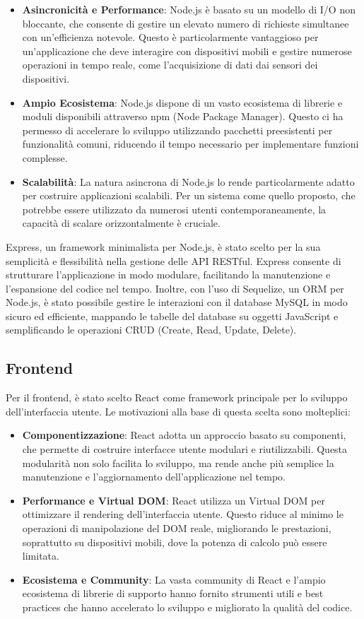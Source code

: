 \documentclass[twoside]{supsistudent}
\begin{document}
\begin{itemize}
  \item \textbf{Asincronicità e Performance}: Node.js è basato su un modello di I/O non bloccante, che consente di gestire un elevato numero di richieste simultanee con un'efficienza notevole. Questo è particolarmente vantaggioso per un'applicazione che deve interagire con dispositivi mobili e gestire numerose operazioni in tempo reale, come l'acquisizione di dati dai sensori dei dispositivi.
  \item \textbf{Ampio Ecosistema}: Node.js dispone di un vasto ecosistema di librerie e moduli disponibili attraverso npm (Node Package Manager). Questo ci ha permesso di accelerare lo sviluppo utilizzando pacchetti preesistenti per funzionalità comuni, riducendo il tempo necessario per implementare funzioni complesse.
  \item \textbf{Scalabilità}: La natura asincrona di Node.js lo rende particolarmente adatto per costruire applicazioni scalabili. Per un sistema come quello proposto, che potrebbe essere utilizzato da numerosi utenti contemporaneamente, la capacità di scalare orizzontalmente è cruciale.
\end{itemize}

Express, un framework minimalista per Node.js, è stato scelto per la sua semplicità e flessibilità nella gestione delle API RESTful. Express consente di strutturare l'applicazione in modo modulare, facilitando la manutenzione e l'espansione del codice nel tempo. Inoltre, con l'uso di Sequelize, un ORM per Node.js, è stato possibile gestire le interazioni con il database MySQL in modo sicuro ed efficiente, mappando le tabelle del database su oggetti JavaScript e semplificando le operazioni CRUD (Create, Read, Update, Delete).

\subsection{Frontend}

Per il frontend, è stato scelto React come framework principale per lo sviluppo dell'interfaccia utente. Le motivazioni alla base di questa scelta sono molteplici:

\begin{itemize}
  \item \textbf{Componentizzazione}: React adotta un approccio basato su componenti, che permette di costruire interfacce utente modulari e riutilizzabili. Questa modularità non solo facilita lo sviluppo, ma rende anche più semplice la manutenzione e l'aggiornamento dell'applicazione nel tempo.
  \item \textbf{Performance e Virtual DOM}: React utilizza un Virtual DOM per ottimizzare il rendering dell'interfaccia utente. Questo riduce al minimo le operazioni di manipolazione del DOM reale, migliorando le prestazioni, soprattutto su dispositivi mobili, dove la potenza di calcolo può essere limitata.
  \item \textbf{Ecosistema e Community}: La vasta community di React e l'ampio ecosistema di librerie di supporto hanno fornito strumenti utili e best practices che hanno accelerato lo sviluppo e migliorato la qualità del codice.
\end{itemize}
\end{document}
